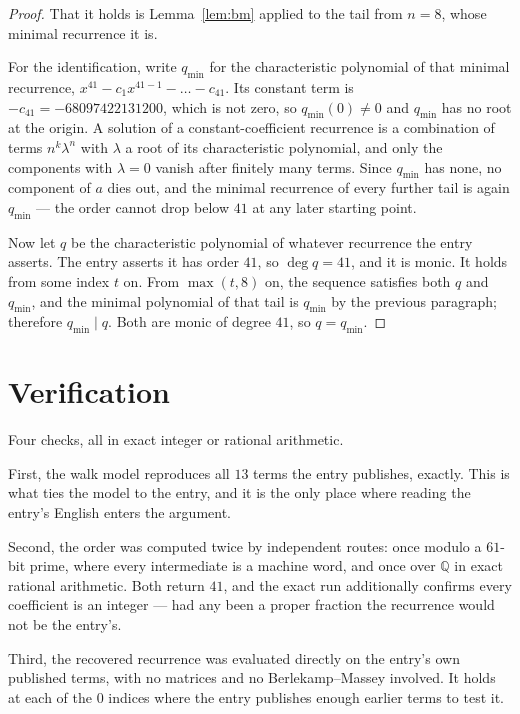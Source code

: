 \documentclass[11pt,a4paper]{article}
\theoremstyle{plain}
\theoremstyle{definition}
\begin{document}
\begin{proof}
That it holds is Lemma~\ref{lem:bm} applied to the tail from $n=8$, whose minimal
recurrence it is.

For the identification, write $q_{\min}$ for the characteristic polynomial of that minimal
recurrence, $x^{41}-c_1x^{41-1}-\dots-c_{41}$. Its constant term is
$-c_{41}=-68097422131200$, which is not zero, so $q_{\min}(0)\neq0$ and $q_{\min}$ has no
root at the origin. A solution of a constant-coefficient recurrence is a combination of terms
$n^{k}\lambda^{n}$ with $\lambda$ a root of its characteristic polynomial, and only the
components with $\lambda=0$ vanish after finitely many terms. Since $q_{\min}$ has none, no
component of $a$ dies out, and the minimal recurrence of every further tail is again
$q_{\min}$ --- the order cannot drop below $41$ at any later starting point.

Now let $q$ be the characteristic polynomial of whatever recurrence the entry asserts. The
entry asserts it has order $41$, so $\deg q=41$, and it is monic. It holds from some
index $t$ on. From $\max(t,8)$ on, the sequence satisfies both $q$ and $q_{\min}$, and
the minimal polynomial of that tail is $q_{\min}$ by the previous paragraph; therefore
$q_{\min}\mid q$. Both are monic of degree $41$, so $q=q_{\min}$.
\end{proof}

\section{Verification}

Four checks, all in exact integer or rational arithmetic.

First, the walk model reproduces all $13$ terms the entry publishes, exactly. This is
what ties the model to the entry, and it is the only place where reading the entry's English
enters the argument.

Second, the order was computed twice by independent routes: once modulo a $61$-bit prime, where
every intermediate is a machine word, and once over $\mathbb{Q}$ in exact rational arithmetic.
Both return $41$, and the exact run additionally confirms every coefficient is an integer
--- had any been a proper fraction the recurrence would not be the entry's.

Third, the recovered recurrence was evaluated directly on the entry's own published terms, with
no matrices and no Berlekamp--Massey involved. It holds at each of the $0$ indices where
the entry publishes enough earlier terms to test it.
\end{document}
